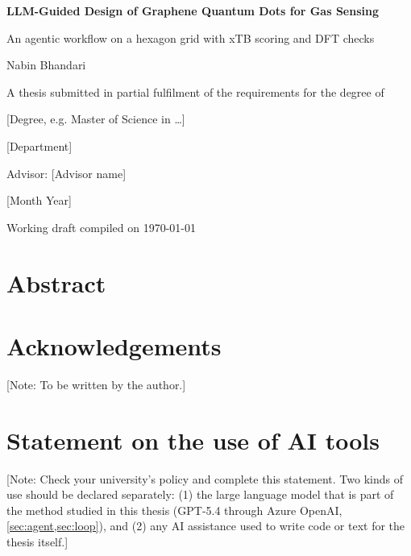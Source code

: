 \documentclass[12pt,letterpaper,oneside]{report}
\newcommand{\authornote}[1]{\textcolor{blue!60!black}{[Note: #1]}}
\newcommand{\thesistitle}{LLM-Guided Design of Graphene Quantum Dots for \ce{NO2} Gas Sensing}
\newcommand{\thesissubtitle}{An agentic workflow on a hexagon grid with xTB scoring and DFT checks}
\newcommand{\thesisauthor}{Nabin Bhandari}
\newcommand{\thesisdegree}{[Degree, e.g. Master of Science in \dots]}
\newcommand{\thesisdepartment}{[Department]}
\newcommand{\thesisuniversity}{[University]}
\newcommand{\thesisadvisor}{[Advisor name]}
\newcommand{\thesisdate}{[Month Year]}
\begin{document}
\begin{titlepage}
  \centering
  \vspace*{1.5cm}
  {\LARGE\bfseries \thesistitle\par}
  \vspace{0.6cm}
  {\large \thesissubtitle\par}
  \vspace{2cm}
  {\large \thesisauthor\par}
  \vspace{2cm}
  A thesis submitted in partial fulfilment of the requirements for the degree of\par
  \vspace{0.3cm}
  {\large \thesisdegree\par}
  \vspace{1.2cm}
  \thesisdepartment\par
  \thesisuniversity\par
  \vspace{1.2cm}
  Advisor: \thesisadvisor\par
  \vfill
  {\large \thesisdate\par}
  \vspace{0.5cm}
  {\small\color{gray} Working draft compiled on \today}
\end{titlepage}


\chapter*{Abstract}


\chapter*{Acknowledgements}
\authornote{To be written by the author.}

\chapter*{Statement on the use of AI tools}
\authornote{Check your university's policy and complete this statement. Two kinds of use should be
declared separately: (1) the large language model that is part of the method studied in this
thesis (GPT-5.4 through Azure OpenAI, \cref{sec:agent,sec:loop}), and (2) any AI assistance used
to write code or text for the thesis itself.}
\end{document}
